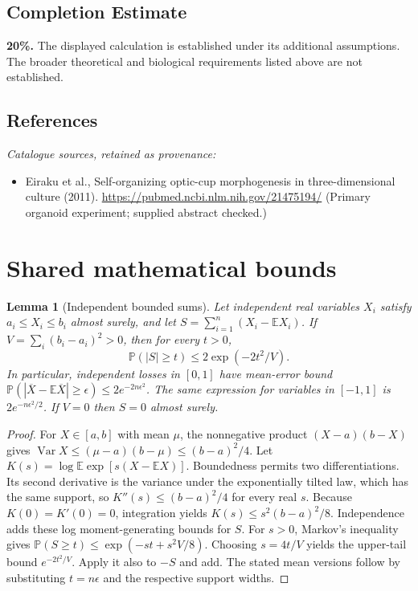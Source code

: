 \documentclass[11pt]{article}
\newcommand{\E}{\mathbb E}
\newcommand{\Prob}{\mathbb P}
\DeclareMathOperator{\Var}{Var}
\providecommand{\E}{\mathbb E}
\providecommand{\Prob}{\mathbb P}
\providecommand{\Var}{\operatorname{Var}}
\newtheorem{sharedlemma}{Lemma}[section]
\begin{document}
\subsection{Completion Estimate}
\textbf{20\%.} The displayed calculation is established under its additional assumptions. The broader theoretical and biological requirements listed above are not established.
\subsection{References}
\noindent\emph{Catalogue sources, retained as provenance:}
\begin{itemize}
\item Eiraku et al., Self-organizing optic-cup morphogenesis in three-dimensional culture (2011). \url{https://pubmed.ncbi.nlm.nih.gov/21475194/} (Primary organoid experiment; supplied abstract checked.)
\end{itemize}
\clearpage


\appendix
\section{Shared mathematical bounds}\label{app:bounds}
\begin{sharedlemma}[Independent bounded sums]\label{lem:bounded}
Let independent real variables $X_i$ satisfy $a_i\leq X_i\leq b_i$ almost surely,
and let $S=\sum_{i=1}^n(X_i-\E X_i)$. If
$V=\sum_i(b_i-a_i)^2>0$, then for every $t>0$,
\[
 \Prob(|S|\geq t)\leq 2\exp(-2t^2/V).
\]
In particular, independent losses in $[0,1]$ have mean-error bound
$\Prob(|\overline X-\E\overline X|\geq\epsilon)
\leq2e^{-2n\epsilon^2}$. The same expression for variables in $[-1,1]$
is $2e^{-n\epsilon^2/2}$. If $V=0$ then $S=0$ almost surely.
\end{sharedlemma}
\begin{proof}
For $X\in[a,b]$ with mean $\mu$, the nonnegative product
$(X-a)(b-X)$ gives
$\Var X\leq(\mu-a)(b-\mu)\leq(b-a)^2/4$.
Let $K(s)=\log\E\exp[s(X-\E X)]$.
Boundedness permits two differentiations. Its second derivative is the variance
under the exponentially tilted law, which has the same support, so
$K''(s)\leq(b-a)^2/4$ for every real $s$.
Because $K(0)=K'(0)=0$, integration yields
$K(s)\leq s^2(b-a)^2/8$.
Independence adds these log moment-generating bounds for $S$.
For $s>0$, Markov's inequality gives
$\Prob(S\geq t)\leq\exp(-st+s^2V/8)$.
Choosing $s=4t/V$ yields the upper-tail bound $e^{-2t^2/V}$.
Apply it also to $-S$ and add. The stated mean versions follow by substituting
$t=n\epsilon$ and the respective support widths.
\end{proof}
\end{document}
